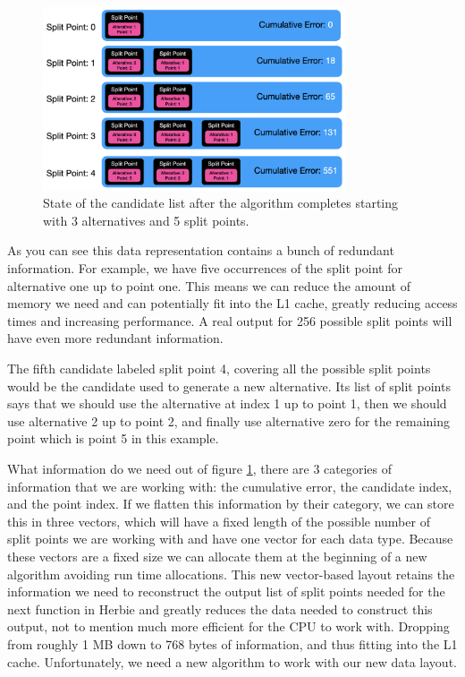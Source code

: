 \documentclass{article}
\begin{document}
\begin{figure}[htbp]
\begin{center}
\includegraphics[width=0.8\textwidth]{candidate-list.png}
\caption{State of the candidate list after the algorithm completes starting with 3 alternatives and 5 split points.}
\label{fig:candidate-list} 
\end{center}
\end{figure}

As you can see this data representation contains a bunch of redundant information. For example, we have five occurrences of the split point for alternative one up to point one. This means we can reduce the amount of memory we need and can potentially fit into the L1 cache, greatly reducing access times and increasing performance. A real output for 256 possible split points will have even more redundant information.

The fifth candidate labeled split point 4, covering all the possible split points would be the candidate used to generate a new alternative. Its list of split points says that we should use the alternative at index 1 up to point 1, then we should use alternative 2 up to point 2, and finally use alternative zero for the remaining point which is point 5 in this example. 

What information do we need out of figure \ref{fig:candidate-list}, there are 3 categories of information that we are working with: the cumulative error, the candidate index, and the point index. If we flatten this information by their category, we can store this in three vectors, which will have a fixed length of the possible number of split points we are working with and have one vector for each data type. Because these vectors are a fixed size we can allocate them at the beginning of a new algorithm avoiding run time allocations. This new vector-based layout retains the information we need to reconstruct the output list of split points needed for the next function in Herbie and greatly reduces the data needed to construct this output, not to mention much more efficient for the CPU to work with. Dropping from roughly 1 MB down to 768 bytes of information, and thus fitting into the L1 cache. 
Unfortunately, we need a new algorithm to work with our new data layout.
\end{document}
